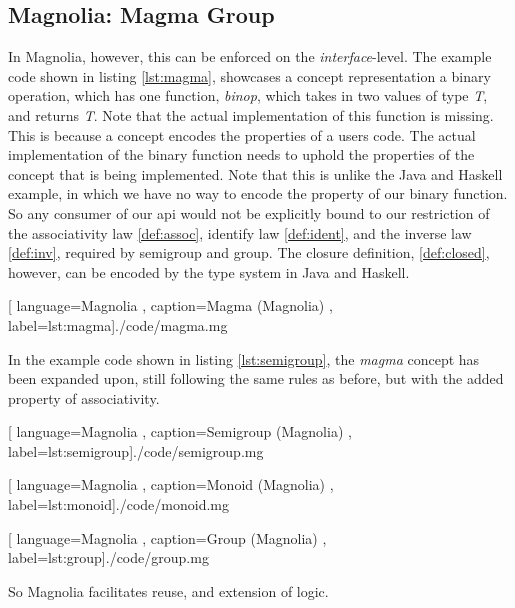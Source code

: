 \subsection{Magnolia: Magma \to Group}

In Magnolia, however, this can be enforced on the \textit{interface}-level. The
example code shown in listing \ref{lst:magma}, showcases a concept
representation a binary operation, which has one function, \textit{binop}, which
takes in two values of type \textit{T}, and returns \textit{T}. Note that the
actual implementation of this function is missing. This is because a concept
encodes the properties of a users code. The actual implementation of the
binary function needs to uphold the properties of the concept that is
being implemented. Note that this is unlike the Java and Haskell example, in
which we have no way to encode the property of our binary function. So any
consumer of our \gls{api} would not be explicitly bound to our restriction of
the associativity law \ref{def:assoc}, identify law \ref{def:ident}, and the
inverse law \ref{def:inv}, required by semigroup and group. The closure
definition, \ref{def:closed}, however, can be encoded by the type system in Java
and Haskell.

\begin{center}
  
    [ language=Magnolia
    , caption={Magma (Magnolia)}
    , label=lst:magma]{./code/magma.mg}
\end{center}

In the example code shown in listing \ref{lst:semigroup}, the \textit{magma}
concept has been expanded upon, still following the same rules as before, but
with the added property of associativity.

\begin{center}
  
    [ language=Magnolia
    , caption={Semigroup (Magnolia)}
    , label=lst:semigroup]{./code/semigroup.mg}
\end{center}

\begin{center}
  
    [ language=Magnolia
    , caption={Monoid (Magnolia)}
    , label=lst:monoid]{./code/monoid.mg}
\end{center}

\begin{center}
  
    [ language=Magnolia
    , caption={Group (Magnolia)}
    , label=lst:group]{./code/group.mg}
\end{center}

So Magnolia facilitates reuse, and extension of logic. 

